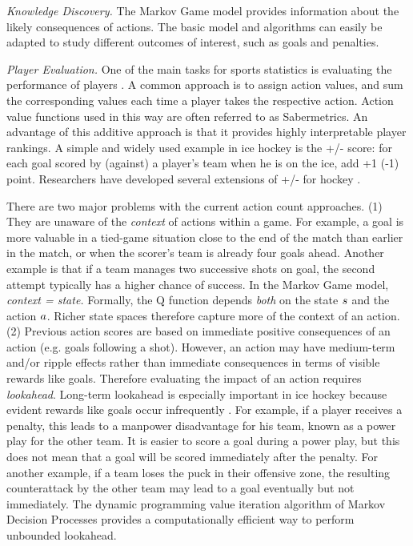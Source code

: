 \documentclass[]{article}
\begin{document}
{\em Knowledge Discovery.} The Markov Game model provides information about the likely consequences of actions. The basic model and algorithms can easily be adapted to study different outcomes of interest, such as goals and penalties.

{\em Player Evaluation.} One of the main tasks for sports statistics is evaluating the performance of players \citep{Schumaker2010}. A common approach is to assign action values, and sum the corresponding values each time a player takes the respective action. Action value functions used in this way are often referred to as Sabermetrics. An advantage of this additive approach is that it provides highly interpretable player rankings. A simple and widely used example in ice hockey is the +/- score: for each goal scored by (against) a player's team when he is on the ice, add +1 (-1) point. Researchers have developed several extensions of +/- for hockey \citep{Macdonald2011a,Spagnola2013,Schuckers2013}. %

There are two major problems with the current action count approaches. (1) They are unaware of the {\em context} of actions within a game. For example, a goal is more valuable in a tied-game situation close to the end of the match than earlier in the match, or when the scorer's team is already four goals ahead. Another example is that if a team manages two successive shots on goal, the second attempt typically has a higher chance of success. In the Markov Game model, \emph{context  = state.}
Formally, the Q function depends {\em both} on the state $s$ and the action $a$. Richer state spaces therefore capture more of the context of an action. (2) Previous action scores are based on immediate positive consequences of an action (e.g. goals following a shot). However, an action may have medium-term and/or ripple effects rather than immediate consequences in terms of visible rewards like goals. Therefore evaluating the impact of an action requires {\em lookahead}.  Long-term lookahead is especially important in ice hockey because evident rewards like goals occur infrequently \citep{Lock2009}. For example, if a player receives a penalty, this leads to a manpower disadvantage for his team, known as a power play for the other team. It is easier to score a goal during a power play, but this does not mean that a goal will be scored immediately after the penalty. For another example, if a team loses the puck in their offensive zone, the resulting counterattack by the other team may lead to a goal eventually but not immediately. The dynamic programming value iteration algorithm of Markov Decision Processes provides a computationally efficient way to perform unbounded lookahead.
\end{document}
